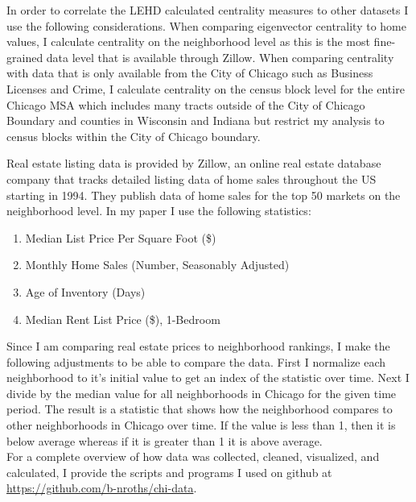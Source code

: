 \documentclass{article}
\theoremstyle{definition}
\theoremstyle{remark}
\begin{document}
In order to correlate the LEHD calculated centrality measures to other datasets I use the following considerations.  When comparing eigenvector centrality to home values, I calculate centrality on the neighborhood level as this is the most fine-grained data level that is available through Zillow.  When comparing centrality with data that is only available from the City of Chicago such as Business Licenses and Crime, I calculate centrality on the census block level for the entire Chicago MSA which includes many tracts outside of the City of Chicago Boundary and counties in Wisconsin and Indiana but restrict my analysis to census blocks within the City of Chicago boundary.

Real estate listing data is provided by Zillow, an online real estate database company that tracks detailed listing data of home sales throughout the US starting in 1994.  They publish data of home sales for the top 50 markets on the neighborhood level.  In my paper I use the following statistics:
\begin{enumerate}
\item Median List Price Per Square Foot (\$)
\item Monthly Home Sales (Number, Seasonably Adjusted)
\item Age of Inventory (Days)
\item Median Rent List Price (\$), 1-Bedroom
\end{enumerate}
Since I am comparing real estate prices to neighborhood rankings, I make the following adjustments to be able to compare the data.  First I normalize each neighborhood to it's initial value to get an index of the statistic over time.  Next I divide by the median value for all neighborhoods in Chicago for the given time period.  The result is a statistic that shows how the neighborhood compares to other neighborhoods in Chicago over time.  If the value is less than 1, then it is below average whereas if it is greater than 1 it is above average. \\
For a complete overview of how data was collected, cleaned, visualized, and calculated, I provide the scripts and programs I used on github at \url{https://github.com/b-nroths/chi-data}. 
\end{document}
